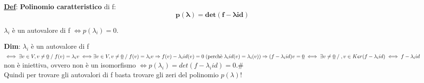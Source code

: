 \documentclass[12pt]{article}
\begin{document}
\textbf{\underline{Def}}: \textbf{Polinomio caratteristico} di f:
$$\boldsymbol{p(\lambda)=det(f-\lambda id)}$$
\begin{theorem}
    $\lambda_i$ è un autovalore di f $\iff p(\lambda_i) = 0$. 
\end{theorem}
\textbf{Dim}: $\lambda_i$ è un autovalore di f $\iff \exists v \in V, v\neq \underline{0} \;/\; f(v) = \lambda_iv \iff \\ \exists v\in V, v\neq \underline{0} \;/\;  f(v) = \lambda_iv \Rightarrow f(v) - \lambda_iid(v) = 0 \; (\text{perchè}\; \lambda_iid(v) = \lambda_i(v))\Rightarrow (f-\lambda_iid)v = \underline{0}\iff  \exists v \neq \underline{0} \;/\;, v\in Ker(f-\lambda_iid) \iff f-\lambda_iid$ non è iniettiva, ovvero non è un isomorfismo $\iff p(\lambda_i)=det(f-\lambda_i id) = 0$.\#\\
Quindi per trovare gli autovalori di f basta trovare gli zeri del polinomio $p(\lambda)!$\\
\end{document}
